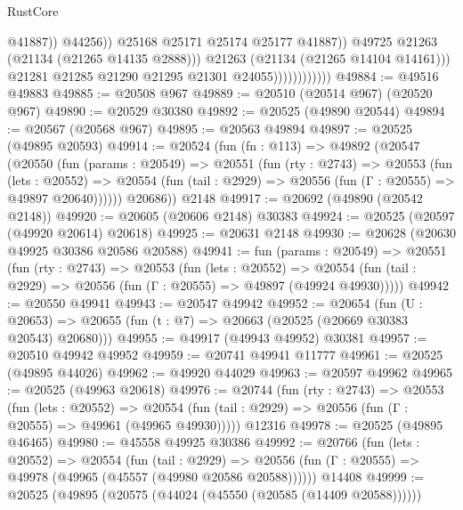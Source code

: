 \begin{lexlean}{RustCore}
\begin{coremodule}
                                            @41887))
                                        @44256))
                                    @25168
                                    @25171
                                    @25174
                                    @25177
                                    @41887))
                                @49725
                                @21263
                                (@21134 (@21265 @14135 @2888)))
                              @21263
                              (@21134 (@21265 @14104 @14161)))
                            @21281
                            @21285
                            @21290
                            @21295
                            @21301
                            @24055))))))))))))
@49884 := @49516 @49883
@49885 := @20508 @967
@49889 := @20510 (@20514 @967) (@20520 @967)
@49890 := @20529 @30380
@49892 := @20525 (@49890 @20544)
@49894 := @20567 (@20568 @967)
@49895 := @20563 @49894
@49897 := @20525 (@49895 @20593)
@49914 := @20524
    (fun (fn : @113) =>
    @49892
      (@20547
        (@20550
          (fun (params : @20549) =>
          @20551
            (fun (rty : @2743) =>
            @20553
              (fun (lets : @20552) =>
              @20554 (fun (tail : @2929) => @20556 (fun (Γ : @20555) => @49897 @20640))))))
        @20686))
    @2148
@49917 := @20692 (@49890 (@20542 @2148))
@49920 := @20605 (@20606 @2148) @30383
@49924 := @20525 (@20597 (@49920 @20614) @20618)
@49925 := @20631 @2148
@49930 := @20628 (@20630 @49925 @30386 @20586 @20588)
@49941 := fun (params : @20549) =>
  @20551
    (fun (rty : @2743) =>
    @20553
      (fun (lets : @20552) =>
      @20554 (fun (tail : @2929) => @20556 (fun (Γ : @20555) => @49897 (@49924 @49930)))))
@49942 := @20550 @49941
@49943 := @20547 @49942
@49952 := @20654
    (fun (U : @20653) => @20655 (fun (t : @7) => @20663 (@20525 (@20669 @30383 @20543) @20680)))
@49955 := @49917 (@49943 @49952) @30381
@49957 := @20510 @49942 @49952
@49959 := @20741 @49941 @11777
@49961 := @20525 (@49895 @44026)
@49962 := @49920 @44029
@49963 := @20597 @49962
@49965 := @20525 (@49963 @20618)
@49976 := @20744
    (fun (rty : @2743) =>
    @20553
      (fun (lets : @20552) =>
      @20554 (fun (tail : @2929) => @20556 (fun (Γ : @20555) => @49961 (@49965 @49930)))))
    @12316
@49978 := @20525 (@49895 @46465)
@49980 := @45558 @49925 @30386
@49992 := @20766
    (fun (lets : @20552) =>
    @20554
      (fun (tail : @2929) =>
      @20556 (fun (Γ : @20555) => @49978 (@49965 (@45557 (@49980 @20586 @20588))))))
    @14408
@49999 := @20525 (@49895 (@20575 (@44024 (@45550 (@20585 (@14409 @20588))))))

\end{coremodule}
\end{lexlean}
